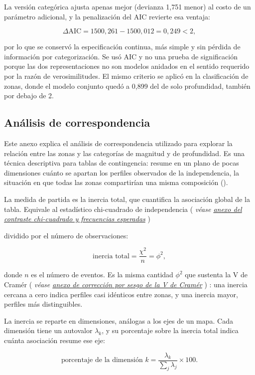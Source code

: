 \documentclass[
  spanish,
  letterpaper,
  DIV=11,
  numbers=noendperiod]{scrartcl}
\newcommand{\asesoriaParenRef}[1]{%
  \textnormal{\textcolor{asesoriaTextColor}{(}}%
  {\hypersetup{linkcolor=asesoriaLinkColor,urlcolor=asesoriaLinkColor,citecolor=asesoriaLinkColor}\textcolor{asesoriaTextColor}{\emph{#1}}}%
  \textnormal{\textcolor{asesoriaTextColor}{)}}%
}
\begin{document}
La versión categórica ajusta apenas mejor (devianza 1,751 menor) al
costo de un parámetro adicional, y la penalización del AIC revierte esa
ventaja:

\[
\Delta\text{AIC}=1500{,}261-1500{,}012=0{,}249<2,
\]

por lo que se conservó la especificación continua, más simple y sin
pérdida de información por categorización. Se usó AIC y no una prueba de
significación porque las dos representaciones no son modelos anidados en
el sentido requerido por la razón de verosimilitudes. El mismo criterio
se aplicó en la clasificación de zonas, donde el modelo conjunto quedó a
0,899 del de solo profundidad, también por debajo de 2.

\subsection{Análisis de
correspondencia}\label{sec-anexo-correspondencia}

Este anexo explica el análisis de correspondencia utilizado para
explorar la relación entre las zonas y las categorías de magnitud y de
profundidad. Es una técnica descriptiva para tablas de contingencia:
resume en un plano de pocas dimensiones cuánto se apartan los perfiles
observados de la independencia, la situación en que todas las zonas
compartirían una misma composición
().

La medida de partida es la inercia total, que cuantifica la asociación
global de la tabla. Equivale al estadístico chi-cuadrado de
independencia
\asesoriaParenRef{véase \hyperref[sec-anexo-chi-esperadas]{anexo del contraste chi-cuadrado y frecuencias esperadas}}
dividido por el número de observaciones:

\[
\text{inercia total}=\frac{\chi^2}{n}=\phi^2,
\]

donde \(n\) es el número de eventos. Es la misma cantidad \(\phi^2\) que
sustenta la V de Cramér
\asesoriaParenRef{véase \hyperref[sec-anexo-cramer]{anexo de corrección por sesgo de la V de Cramér}}:
una inercia cercana a cero indica perfiles casi idénticos entre zonas, y
una inercia mayor, perfiles más distinguibles.

La inercia se reparte en dimensiones, análogas a los ejes de un mapa.
Cada dimensión tiene un autovalor \(\lambda_k\), y su porcentaje sobre
la inercia total indica cuánta asociación resume ese eje:

\[
\text{porcentaje de la dimensión }k=\frac{\lambda_k}{\sum_j \lambda_j}\times 100.
\]
\end{document}
